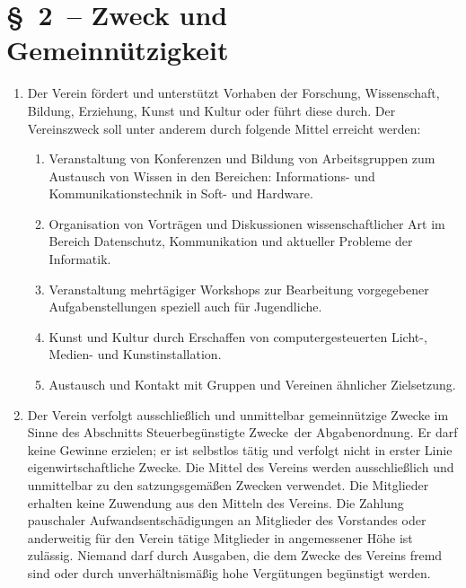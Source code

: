 \documentclass[11pt,DIV12]{scrartcl}
\begin{document}
\section*{§~2~-- Zweck und Gemeinnützigkeit}
\begin{enumerate}
\item Der Verein fördert und unterstützt Vorhaben der Forschung, Wissenschaft, Bildung, Erziehung, Kunst und Kultur oder führt diese durch. Der Vereinszweck soll unter anderem durch folgende Mittel erreicht werden:
\begin{enumerate}
    \item Veranstaltung von Konferenzen und Bildung von Arbeitsgruppen zum Austausch von Wissen in den Bereichen: Informations- und Kommunikationstechnik in Soft- und Hardware.
    \item Organisation von Vorträgen und Diskussionen wissenschaftlicher Art im Bereich Datenschutz, Kommunikation und aktueller Probleme der Informatik.
    \item Veranstaltung mehrtägiger Workshops zur Bearbeitung vorgegebener Aufgabenstellungen speziell auch für Jugendliche.
    \item Kunst und Kultur durch Erschaffen von computergesteuerten Licht-, Medien- und Kunstinstallation.
    \item Austausch und Kontakt mit Gruppen und Vereinen ähnlicher Zielsetzung.
\end{enumerate}
\item Der Verein verfolgt ausschließlich und unmittelbar gemeinnützige Zwecke im Sinne des Abschnitts \glqq Steuerbegünstigte Zwecke\grqq\ der Abgabenordnung. Er darf keine Gewinne erzielen; er ist selbstlos tätig und verfolgt nicht in erster Linie eigenwirtschaftliche Zwecke. Die Mittel des Vereins werden ausschließlich und unmittelbar zu den satzungsgemäßen Zwecken verwendet. Die Mitglieder erhalten keine Zuwendung aus den Mitteln des Vereins. Die Zahlung pauschaler Aufwandsentschädigungen an Mitglieder des Vorstandes oder anderweitig für den Verein tätige Mitglieder in angemessener Höhe ist zulässig. Niemand darf durch Ausgaben, die dem Zwecke des Vereins fremd sind oder durch unverhältnismäßig hohe Vergütungen begünstigt werden.
\end{enumerate}
\end{document}
